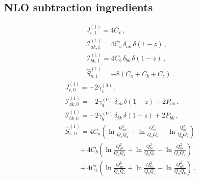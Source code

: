 \subsection{NLO subtraction ingredients}
\begin{subequations}
\label{eq:C11-ingred}
\begin{align}
&J_{c,1}^{(1)} = 4C_c\,, \\[1ex]
&\mathcal{I}_{ak,1}^{(1)} = 4C_a\,\delta_{ak}\,\delta(1-z)\,, \\[1ex]
&\mathcal{I}_{bk,1}^{(1)} = 4C_b\,\delta_{bk}\,\delta(1-z)\,, \\[1ex]
&\widehat{S}_{\kappa,1}^{(1)} = -8(C_a+C_b+C_c)\,.
\end{align}
\end{subequations}
%
\begin{subequations}
\label{eq:C10-ingred}
\begin{align}
&J_{c,0}^{(1)} = -2\gamma_c^{(0)}\,, \\[1ex]
&\mathcal{I}_{ak,0}^{(1)} = -2\gamma_a^{(0)}\,\delta_{ak}\,\delta(1-z)+2P_{ak}\,, \\[1ex]
&\mathcal{I}_{bk,0}^{(1)} = -2\gamma_b^{(0)}\,\delta_{bk}\,\delta(1-z)+2P_{bk}\,, \\[1ex]
&\widehat{S}_{\kappa,0}^{(1)} =
    4C_a\!\left(\ln\frac{Q_{ab}^2}{Q_a Q_b}+\ln\frac{Q_{ac}^2}{Q_a Q_c}
    -\ln\frac{Q_{bc}^2}{Q_b Q_c}\right) \nonumber\\[0.5ex]
  &\qquad+4C_b\!\left(\ln\frac{Q_{ab}^2}{Q_a Q_b}+\ln\frac{Q_{bc}^2}{Q_b Q_c}
    -\ln\frac{Q_{ac}^2}{Q_a Q_c}\right) \nonumber\\[0.5ex]
  &\qquad+4C_c\!\left(\ln\frac{Q_{ac}^2}{Q_a Q_c}+\ln\frac{Q_{bc}^2}{Q_b Q_c}
    -\ln\frac{Q_{ab}^2}{Q_a Q_b}\right)\,.
\end{align}
\end{subequations}
%
